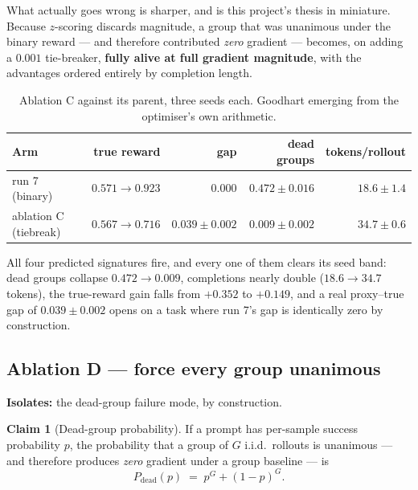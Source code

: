 \documentclass[11pt,letterpaper]{article}
\theoremstyle{definition}
\newtheorem{claim}{Claim}[section]
\begin{document}
What actually goes wrong is sharper, and is this project's thesis in miniature. Because $z$-scoring
discards magnitude, a group that was unanimous under the binary reward --- and therefore contributed
\emph{zero} gradient --- becomes, on adding a $0.001$ tie-breaker, \textbf{fully alive at full
gradient magnitude}, with the advantages ordered entirely by completion length.

\begin{table}[H]
\centering
\caption{Ablation C against its parent, three seeds each. Goodhart emerging from the optimiser's own
arithmetic.}
\label{tab:abC}
\small
\begin{tabular}{@{}lrrrr@{}}
\toprule
\textbf{Arm} & \textbf{true reward} & \textbf{gap} & \textbf{dead groups} & \textbf{tokens/rollout} \\
\midrule
run 7 (binary)        & $0.571 \to 0.923$ & $0.000$ & $0.472 \pm 0.016$ & $18.6 \pm 1.4$ \\
ablation C (tiebreak) & $0.567 \to 0.716$ & $0.039 \pm 0.002$ & $\mathbf{0.009 \pm 0.002}$ & $\mathbf{34.7 \pm 0.6}$ \\
\bottomrule
\end{tabular}
\end{table}

All four predicted signatures fire, and every one of them clears its seed band: dead groups collapse
$0.472 \to 0.009$, completions nearly double ($18.6 \to 34.7$ tokens), the true-reward gain falls
from $+0.352$ to $+0.149$, and a real proxy--true gap of $0.039 \pm 0.002$ opens on a task where run
7's gap is identically zero by construction.

\subsection{Ablation D --- force every group unanimous}
\label{sec:abD}

\textbf{Isolates:} the dead-group failure mode, by construction.

\begin{claim}[Dead-group probability]
\label{claim:dead}
If a prompt has per-sample success probability $p$, the probability that a group of $G$ i.i.d.\
rollouts is unanimous --- and therefore produces \emph{zero} gradient under a group baseline --- is
\begin{equation}
  P_{\text{dead}}(p) \;=\; p^G + (1-p)^G .
\end{equation}
\end{claim}
\end{document}
